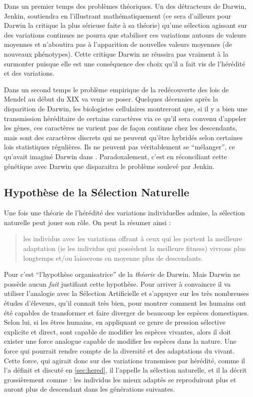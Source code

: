 \documentclass[a4paper,10pt]{article}
\begin{document}
Dans un premier temps des problèmes théoriques. Un des détracteurs de Darwin, Jenkin, soutiendra en l'illustrant mathématiquement (ce sera d'ailleurs pour Darwin la critique la plus sérieuse faite à sa théorie) qu'une sélection agissant sur des variations continues ne pourra que stabiliser ces variations autours de valeurs moyennes et n'aboutira pas à l'apparition de nouvelles valeurs moyennes (de nouveaux phénotypes). Cette critique Darwin ne réussira pas vraiment à la surmonter puisque elle est une conséquence des choix qu'il a fait vis de l'hérédité et des variations. 

Dans un second temps le problème empirique de la redécouverte des lois de Mendel  au début du XIX va venir se poser. Quelques décennies après la disparition de Darwin, les biologistes cellulaires montreront que, si il y a bien une transmission héréditaire de certains caractères via ce qu'il sera convenu d'appeler les gènes, ces caractères ne varient pas de façon continue chez les descendants, mais sont des caractères discrets qui ne peuvent qu'être hybridés selon certaines lois statistiques régulières. Ils ne peuvent pas véritablement se ``mélanger'', ce qu'avait imaginé Darwin dans \cite{darwin1868variation}. Paradoxalement, c'est en réconciliant cette génétique avec Darwin que disparaitra le problème soulevé par Jenkin. 

\subsection{Hypothèse de la Sélection Naturelle}\label{sec:SN}
Une fois une théorie de l'hérédité des variations individuelles admise, la sélection naturelle peut jouer son rôle. On peut la résumer ainsi :
\begin{quote} les individus avec les variations offrant à ceux qui les portent la meilleure adaptation (ie les individus qui possèdent la meilleure fitness) vivrons plus longtemps et/ou laisserons en moyenne plus de descendants.\end{quote}

	Pour \cite[p. 22]{gayon1991darwinetlapresdarwin} c'est ``l'hypothèse organisatrice'' de la \emph{théorie} de Darwin. Mais Darwin ne possède aucun \emph{fait} justifiant cette hypothèse. Pour arriver à convaincre il va utiliser l'analogie avec la Sélection Artificielle et s'appuyer sur les très nombreuses études d'éleveurs, qu'il connait très bien, pour montrer comment les humains ont été capables de transformer et faire diverger de beaucoup les espèces domestiques. Selon lui, si les êtres humains, en appliquant ce genre de pression sélective explicite et direct, sont capable de modifier les espèces vivantes, alors il doit exister une force analogue capable de modifier les espèces dans la nature. Une force qui pourrait rendre compte de la diversité et des adaptations du vivant. Cette force, qui agirait donc sur des variations transmises par hérédité, comme il l'a définit et discuté en \ref{sec:hered}, il l'appelle la sélection naturelle, et il la décrit grossièrement comme : les individus les mieux adaptés se reproduiront plus et auront plus de descendant dans les générations suivantes. 
\end{document}
